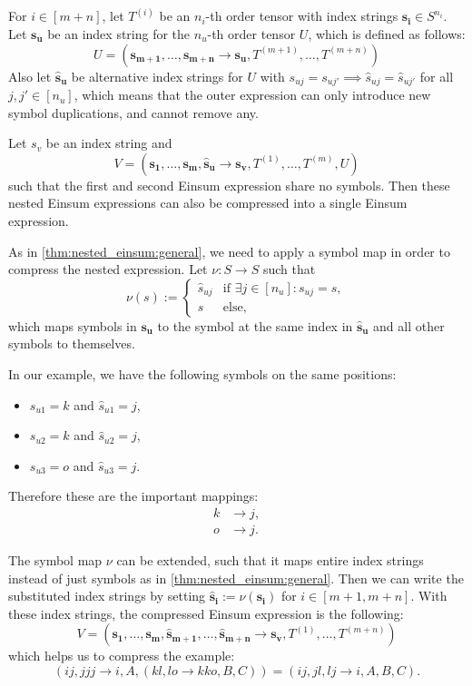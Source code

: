 \begin{theorem}
    \label{thm:nested_einsum:introduce_duplications}

    For $i \in [m + n]$, let $T^{(i)}$ be an $n_i$-th order tensor with index strings $\bm{s_i} \in S^{n_i}$.
    Let $\bm{s_u}$ be an index string for the $n_u$-th order tensor $U$, which is defined as follows:
    $$U = (\bm{s_{m + 1}},\dots,\bm{s_{m + n}} \rightarrow \bm{s_u}, T^{(m + 1)},\dots,T^{(m + n)})$$
    Also let $\bm{\hat{s}_u}$ be alternative index strings for $U$ with $s_{uj} = s_{uj'} \implies \hat{s}_{uj} = \hat{s}_{uj'}$ for all $j, j' \in [n_u]$,
    which means that the outer expression can only introduce new symbol duplications, and cannot remove any.

    Let $s_v$ be an index string and
    $$V = (\bm{s_1},\dots,\bm{s_m}, \bm{\hat{s}_u} \rightarrow \bm{s_v}, T^{(1)},\dots,T^{(m)}, U)$$
    such that the first and second Einsum expression share no symbols.
    Then these nested Einsum expressions can also be compressed into a single Einsum expression.

    As in \cref{thm:nested_einsum:general}, we need to apply a symbol map in order to compress the nested expression.
    Let $\nu: S \rightarrow S$ such that
    $$\nu(s) := \begin{cases}
            \hat{s}_{uj} & \text{if $\exists j \in [n_u]: s_{uj} = s$}, \\
            s            & \text{else},
        \end{cases}$$
    which maps symbols in $\bm{s_u}$ to the symbol at the same index in $\bm{\hat{s}_u}$ and all other symbols to themselves.

    In our example, we have the following symbols on the same positions:
    \begin{itemize}
        \item $s_{u1} = k$ and $\hat{s}_{u1} = j$,
        \item $s_{u2} = k$ and $\hat{s}_{u2} = j$,
        \item $s_{u3} = o$ and $\hat{s}_{u3} = j$.
    \end{itemize}
    Therefore these are the important mappings:
    \begin{align*}
        k & \rightarrow j, \\
        o & \rightarrow j.
    \end{align*}

    The symbol map $\nu$ can be extended, such that it maps entire index strings instead of just symbols as in \cref{thm:nested_einsum:general}.
    Then we can write the substituted index strings by setting $\bm{\hat{s}_i} := \nu(\bm{s_i})$ for $i \in [m + 1, m + n]$.
    With these index strings, the compressed Einsum expression is the following:
    $$V = (\bm{s_1},\dots,\bm{s_m}, \bm{\hat{s}_{m + 1}}, \dots, \bm{\hat{s}_{m + n}} \rightarrow \bm{s_v}, T^{(1)},\dots,T^{(m + n)})$$
    which helps us to compress the example:
    $$(ij, jjj \rightarrow i, A, (kl, lo \rightarrow kko, B, C)) = (ij, jl, lj \rightarrow i, A, B, C).$$
\end{theorem}

